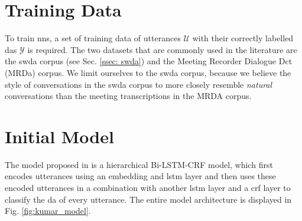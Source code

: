 

    \section{Training Data}
    To train \glspl{nn}, a set of training data of \glspl{utterance} $\mathcal{U}$ with their correctly labelled \glspl{da} $\mathcal{Y}$ is required. The two datasets that are commonly used in the literature are the \gls{swda} corpus (see Sec. \ref{ssec: swda}) and the Meeting Recorder Dialogue Dct (MRDa) corpus\cite{shriberg2004icsi}. We limit ourselves to the \gls{swda} corpus, because we believe the style of conversations in the \gls{swda} corpus to more closely resemble \textit{natural} conversations than the meeting transcriptions in the MRDA corpus.

    \section{Initial Model \label{method: kumar model}}
    The \gls{model} proposed in \cite{kumar2017dialogue} is a hierarchical Bi-LSTM-CRF \gls{model}, which first encodes \glspl{utterance} using an \gls{embedding} and \gls{lstm} layer and then uses these encoded \glspl{utterance} in a combination with another \gls{lstm} layer and a \gls{crf} layer to classify the \gls{da} of every \gls{utterance}. The entire \gls{model} architecture is displayed in Fig. \ref{fig:kumar_model}.


